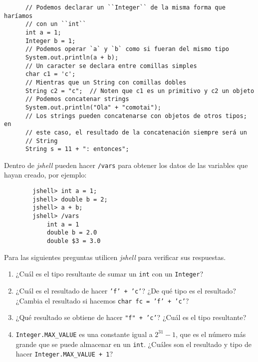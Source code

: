     \begin{verbatim}
      // Podemos declarar un ``Integer`` de la misma forma que haríamos
      // con un ``int``
      int a = 1;
      Integer b = 1;
      // Podemos operar `a` y `b` como si fueran del mismo tipo
      System.out.println(a + b);
      // Un caracter se declara entre comillas simples
      char c1 = 'c';
      // Mientras que un String con comillas dobles
      String c2 = "c";  // Noten que c1 es un primitivo y c2 un objeto
      // Podemos concatenar strings
      System.out.println("Ola" + "comotai");
      // Los strings pueden concatenarse con objetos de otros tipos; en
      // este caso, el resultado de la concatenación siempre será un 
      // String
      String s = 11 + ": entonces";
    \end{verbatim}

    \begin{exercise}
      Dentro de \textit{jshell} pueden hacer \texttt{/vars} para obtener los datos de las variables 
      que hayan creado, por ejemplo:
      \begin{verbatim}
        jshell> int a = 1;
        jshell> double b = 2;
        jshell> a + b;
        jshell> /vars
            int a = 1
            double b = 2.0
            double $3 = 3.0
      \end{verbatim}

      Para las siguientes preguntas utilicen \textit{jshell} para verificar sus respuestas.
      \begin{enumerate}
        \item ¿Cuál es el tipo resultante de sumar un \texttt{int} con un \texttt{Integer}?
        \item ¿Cuál es el resultado de hacer \texttt{'f' + 'c'}?
          ¿De qué tipo es el resultado?
          ¿Cambia el resultado si hacemos \texttt{char fc = 'f' + 'c'}?
        \item ¿Qué resultado se obtiene de hacer \texttt{"f" + 'c'}?
          ¿Cuál es el tipo resultante?
        \item \texttt{Integer.MAX_VALUE} es una constante igual a \(2^{31} - 1\), que es el 
          número más grande que se puede almacenar en un \texttt{int}.
          ¿Cuáles son el resultado y tipo de hacer \texttt{Integer.MAX_VALUE + 1}?
      \end{enumerate}
    \end{exercise}
%